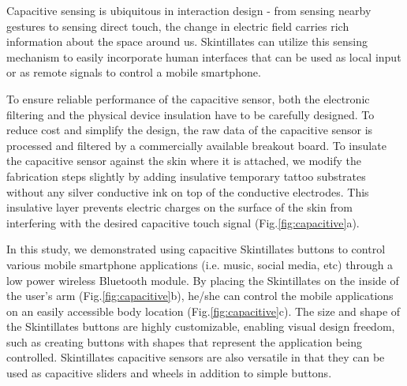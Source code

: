 \documentclass{sigchi}
\begin{document}
Capacitive sensing is ubiquitous in interaction design - from sensing nearby gestures to sensing direct touch, the change in electric field carries rich information about the space around us. Skintillates can utilize this sensing mechanism to easily incorporate human interfaces that can be used as local input or as remote signals to control a mobile smartphone.

To ensure reliable performance of the capacitive sensor, both the electronic filtering and the physical device insulation have to be carefully designed. To reduce cost and simplify the design, the raw data of the capacitive sensor is processed and filtered by a commercially available breakout board\footnotemark[1]. To insulate the capacitive sensor against the skin where it is attached, we modify the fabrication steps slightly by adding insulative temporary tattoo substrates without any silver conductive ink on top of the conductive electrodes. This insulative layer prevents electric charges on the surface of the skin from interfering with the desired capacitive touch signal (Fig.\ref{fig:capacitive}a). 

In this study, we demonstrated using capacitive Skintillates buttons to control various mobile smartphone applications (i.e. music, social media, etc) through a low power wireless Bluetooth module\footnotemark[2]. By placing the Skintillates on the inside of the user’s arm (Fig.\ref{fig:capacitive}b), he/she can control the mobile applications on an easily accessible body location (Fig.\ref{fig:capacitive}c). The size and shape of the Skintillates buttons are highly customizable, enabling visual design freedom, such as creating buttons with shapes that represent the application being controlled. Skintillates capacitive sensors are also versatile in that they can be used  as capacitive sliders and wheels in addition to simple buttons.

\end{document}
